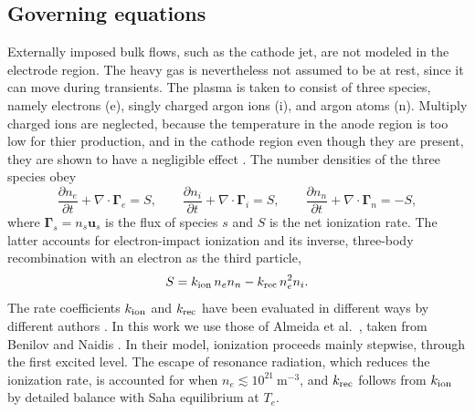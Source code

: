 
\subsection{Governing equations}
\label{sec:model-governing}
 Externally imposed bulk flows, such as the cathode jet, are not modeled in the electrode region. The heavy gas is nevertheless not assumed to be at rest, since it can move during transients. The plasma is taken to consist of three species, namely electrons (e), singly charged argon ions (i), and argon atoms (n). Multiply charged ions are neglected, because the temperature in the anode region is too low for thier production, and in the cathode region even though they are present, they are shown to have a negligible effect \cite{almeida2000simulation}. 
The number densities of the three species obey
\begin{equation}
\frac{\partial n_e}{\partial t}+\nabla\cdot\boldsymbol{\Gamma}_e=S,
\qquad
\frac{\partial n_i}{\partial t}+\nabla\cdot\boldsymbol{\Gamma}_i=S,
\qquad
\frac{\partial n_n}{\partial t}+\nabla\cdot\boldsymbol{\Gamma}_n=-S,
\label{eq:continuity}
\end{equation}
where \(\boldsymbol{\Gamma}_s=n_s\mathbf{u}_s\) is the flux of species \(s\) and \(S\) is the net ionization rate. The latter accounts for electron-impact ionization and its inverse, three-body recombination with an electron as the third particle,
\begin{equation}
S=k_{\rm ion}\,n_en_n-k_{\rm rec}\,n_e^2n_i .
\label{eq:S}
\end{equation}
The rate coefficients \(k_{\rm ion}\) and \(k_{\rm rec}\) have been evaluated in different ways by different authors \cite{Almeida2008,DinulescuPfender1980,Lowke2006,LiangTrelles}. In this work we use those of Almeida et al.\ \cite{Almeida2008}, taken from Benilov and Naidis \cite{benilov1998ionization}. In their model, ionization proceeds mainly stepwise, through the first excited level. The escape of resonance radiation, which reduces the ionization rate, is accounted for when \(n_e\lesssim10^{21}~\mathrm{m^{-3}}\), and \(k_{\rm rec}\) follows from \(k_{\rm ion}\) by detailed balance with Saha equilibrium at \(T_e\).

